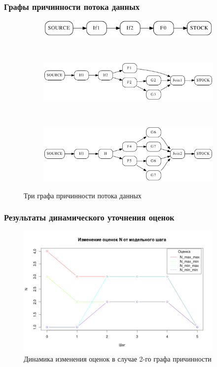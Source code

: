 \documentclass[10pt,pdf,hyperref={unicode}]{beamer}
\begin{document}
\begin{frame}
  \frametitle{Графы причинности потока данных}
  \begin{figure}[H]
  \centering
  \begin{subfigure}[b]{0.80\textwidth}
    \centering
    \includegraphics[width=\textwidth]{example2_task_graph_1.pdf}
    \vspace{7pt}
  \end{subfigure}
  ~
  \begin{subfigure}[b]{0.80\textwidth}
    \centering
    \includegraphics[width=\textwidth]{example2_task_graph_2.pdf}
    \vspace{7pt}
  \end{subfigure}
  ~
  \begin{subfigure}[b]{0.80\textwidth}
    \centering
    \includegraphics[width=\textwidth]{example2_task_graph_3.pdf}
  \end{subfigure}
  \caption{Три графа причинности потока данных }
\end{figure}
\end{frame}

\begin{frame}
  \frametitle{Результаты динамического уточнения оценок}
  \begin{figure}[H]
    \centering
    \includegraphics[width=0.9\textwidth]{Rplot01}
    \caption{Динамика изменения оценок в случае 2-го графа причинности}
  \end{figure}
\end{frame}
\end{document}
